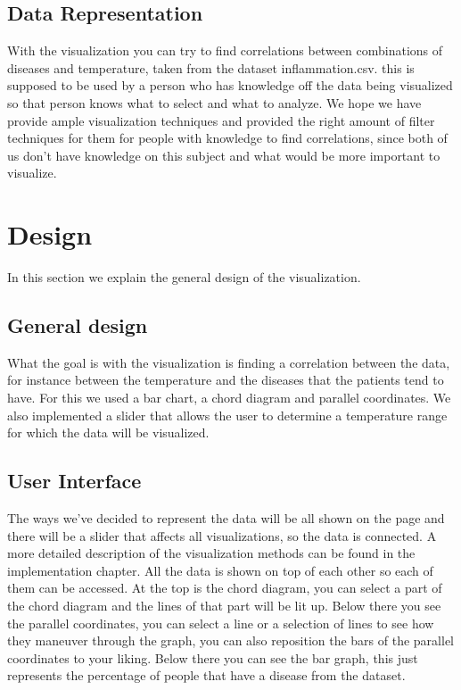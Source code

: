 \documentclass[a4paper,twoside,11pt]{article}
\begin{document}
\subsection{Data Representation}
With the visualization you can try to find correlations between combinations of diseases and temperature, taken from the dataset inflammation.csv. this is supposed to be used by a person who has knowledge off the data being visualized so that person knows what to select and what to analyze. We hope we have provide ample visualization techniques and provided the right amount of filter techniques for them for people with knowledge to find correlations, since both of us don't have knowledge on this subject and what would be more important to visualize.
\newpage
\section{Design}
In this section we explain the general design of the visualization.
\subsection{General design}
What the goal is with the visualization is finding a correlation between the data, for instance between the temperature and the diseases that the patients tend to have. For this we used a bar chart, a chord diagram and parallel coordinates. We also implemented a slider that allows the user to determine a temperature range for which the data will be visualized.
\subsection{User Interface}
The ways we've decided to represent the data will be all shown on the page and there will be a slider that affects all visualizations, so the data is connected. A more detailed description of the visualization methods can be found in the implementation chapter. \newline
All the data is shown on top of each other so each of them can be accessed. At the top is the chord diagram, you can select a part of the chord diagram and the lines of that part will be lit up. Below there you see the parallel coordinates, you can select a line or a selection of lines to see how they maneuver through the graph, you can also reposition the bars of the parallel coordinates to your liking. Below there you can see the bar graph, this just represents the percentage of people that have a disease from the dataset.
\newpage
\end{document}
